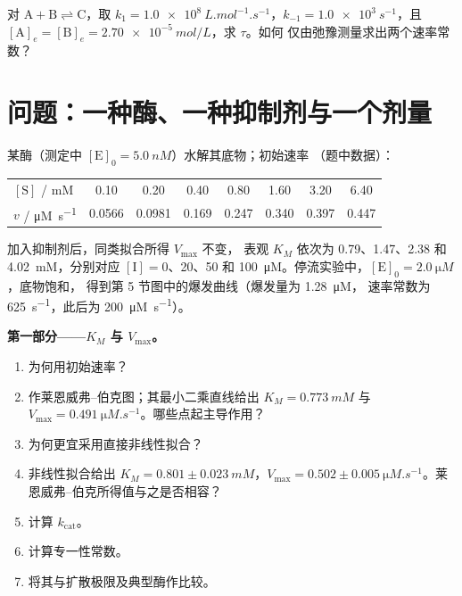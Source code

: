 \begin{exercise}[$\star\star\star$]\label{exo:b3:complex-kinetics:12}
 对 $\mathrm{A + B \rightleftharpoons C}$，取 $k_1 = \qty{1.0e8}{L.mol^{-1}.s^{-1}}$，$k_{-1} = \qty{1.0e3}{s^{-1}}$，且
 $[\mathrm A]_e = [\mathrm B]_e = \qty{2.70e-5}{mol/L}$，求 $\tau$。如何
 仅由弛豫测量求出两个速率常数？
\end{exercise}

\section{问题：一种酶、一种抑制剂与一个剂量}

\begin{problem}
\label{pb:b3:complex-kinetics:1}
某酶（测定中 $[\mathrm E]_0 = \qty{5.0}{nM}$）水解其底物；初始速率
（题中数据）：
\begin{center}\small
\begin{tabular}{lccccccc}
\hline
$[\mathrm S]$ / mM & 0.10 & 0.20 & 0.40 & 0.80 & 1.60 & 3.20 & 6.40 \\
$v$ / \unit{\micro M.s^{-1}} & 0.0566 & 0.0981 & 0.169 & 0.247 & 0.340 & 0.397 & 0.447 \\ \hline
\end{tabular}
\end{center}
加入抑制剂后，同类拟合所得 $V_{\max}$ 不变，
表观 $K_M$ 依次为 0.79、1.47、2.38 和 \qty{4.02}{mM}，分别对应 $[\mathrm I] = 0$、20、50 和
\qty{100}{\micro M}。停流实验中，$[\mathrm E]_0 = \qty{2.0}{\micro M}$，底物饱和，
得到第 5 节图中的爆发曲线（爆发量为 \qty{1.28}{\micro M}，
速率常数为 \qty{625}{s^{-1}}，此后为 \qty{200}{\micro M.s^{-1}}）。

\medskip\noindent\textbf{第一部分——$K_M$ 与 $V_{\max}$。}
\begin{enumerate}
  \item 为何用初始速率？
  \item 作莱恩威弗–伯克图；其最小二乘直线给出 $K_M =
        \qty{0.773}{mM}$ 与 $V_{\max} = \qty{0.491}{\micro M.s^{-1}}$。哪些点起主导作用？
  \item 为何更宜采用直接非线性拟合？
  \item 非线性拟合给出 $K_M = 0.801 \pm \qty{0.023}{mM}$，$V_{\max} = 0.502 \pm
        \qty{0.005}{\micro M.s^{-1}}$。莱恩威弗–伯克所得值与之是否相容？
  \item 计算 $k_{\mathrm{cat}}$。
  \item 计算专一性常数。
  \item 将其与扩散极限及典型酶作比较。
\end{enumerate}


\end{problem}

